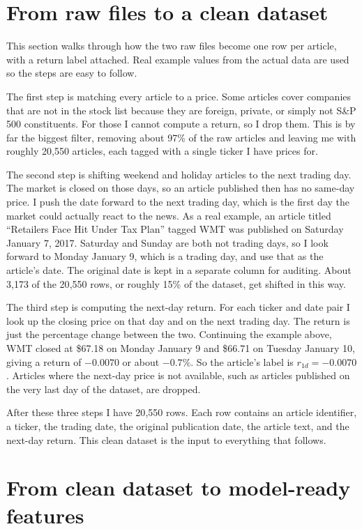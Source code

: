 \documentclass[11pt]{article}
\begin{document}
\section{From raw files to a clean dataset}

This section walks through how the two raw files become one row per article, with a return label attached. Real example values from the actual data are used so the steps are easy to follow.

The first step is matching every article to a price. Some articles cover companies that are not in the stock list because they are foreign, private, or simply not S\&P 500 constituents. For those I cannot compute a return, so I drop them. This is by far the biggest filter, removing about 97\% of the raw articles and leaving me with roughly 20{,}550 articles, each tagged with a single ticker I have prices for.

The second step is shifting weekend and holiday articles to the next trading day. The market is closed on those days, so an article published then has no same-day price. I push the date forward to the next trading day, which is the first day the market could actually react to the news. As a real example, an article titled ``Retailers Face Hit Under Tax Plan'' tagged WMT was published on Saturday January 7, 2017. Saturday and Sunday are both not trading days, so I look forward to Monday January 9, which is a trading day, and use that as the article's date. The original date is kept in a separate column for auditing. About 3{,}173 of the 20{,}550 rows, or roughly 15\% of the dataset, get shifted in this way.

The third step is computing the next-day return. For each ticker and date pair I look up the closing price on that day and on the next trading day. The return is just the percentage change between the two. Continuing the example above, WMT closed at \$67.18 on Monday January 9 and \$66.71 on Tuesday January 10, giving a return of $-0.0070$ or about $-0.7\%$. So the article's label is $r_{1d} = -0.0070$. Articles where the next-day price is not available, such as articles published on the very last day of the dataset, are dropped.

After these three steps I have 20{,}550 rows. Each row contains an article identifier, a ticker, the trading date, the original publication date, the article text, and the next-day return. This clean dataset is the input to everything that follows.

\section{From clean dataset to model-ready features}
\end{document}
